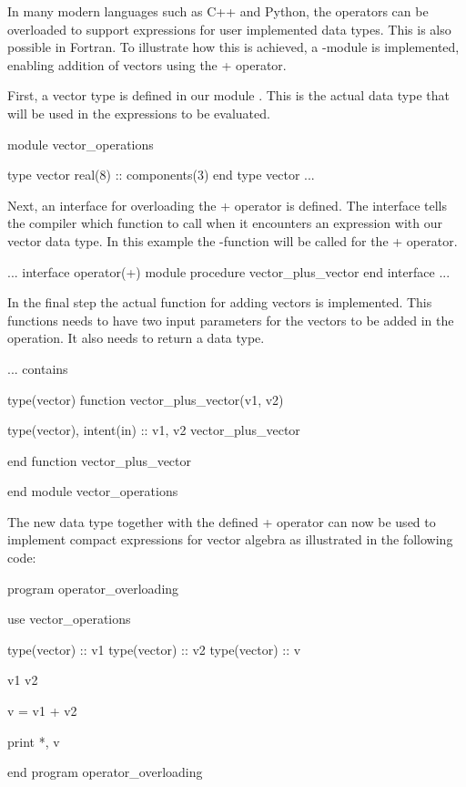 In many modern languages such as C++ and Python, the operators can be overloaded to support expressions for user implemented data types. This is also possible in Fortran. To illustrate how this is achieved, a -module is implemented, enabling addition of vectors using the + operator. 

First, a vector type is defined in our module . This is the actual data type that will be used in the expressions to be evaluated.

\begin{fortrancodeenv}
module vector_operations

	type vector
		real(8) :: components(3)
	end type vector
	...
\end{fortrancodeenv}

Next, an interface for overloading the + operator is defined. The interface tells the compiler which function to call when it encounters an expression with our vector data type. In this example the -function will be called for the + operator.

\begin{fortrancodeenv}
	...
	interface operator(+)
		module procedure vector_plus_vector
	end interface
	...
\end{fortrancodeenv}

In the final step the actual function for adding vectors is implemented. This functions needs to have two input parameters for the vectors to be added in the operation. It also needs to return a  data type.

\begin{fortrancodeenv}
...
contains

type(vector) function vector_plus_vector(v1, v2)

	type(vector), intent(in) :: v1, v2
	vector_plus_vector%
	
end function vector_plus_vector

end module vector_operations
\end{fortrancodeenv}

The new data type together with the defined + operator can now be used to implement compact expressions for vector algebra as illustrated in the following code:

\begin{fortrancodeenv}
program operator_overloading

	use vector_operations

	type(vector) :: v1
	type(vector) :: v2
	type(vector) :: v
	
	v1%
	v2%
	
	v = v1 + v2
	
	print *, v

end program operator_overloading
\end{fortrancodeenv}

